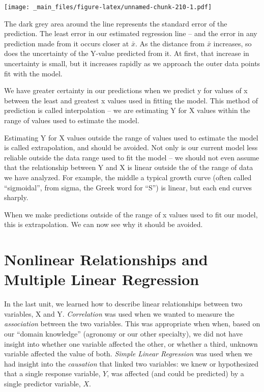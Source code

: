 \documentclass[
]{book}
\begin{document}
\texttt{[image: \_main\_files/figure-latex/unnamed-chunk-210-1.pdf]}

The dark grey area around the line represents the standard error of the prediction. The least error in our estimated regression line -- and the error in any prediction made from it occurs closer at \(\bar{x}\). As the distance from \(\bar{x}\) increases, so does the uncertainty of the Y-value predicted from it. At first, that increase in uncertainty is small, but it increases rapidly as we approach the outer data points fit with the model.

We have greater certainty in our predictions when we predict y for values of x between the least and greatest x values used in fitting the model. This method of prediction is called interpolation -- we are estimating Y for X values within the range of values used to estimate the model.

Estimating Y for X values outside the range of values used to estimate the model is called extrapolation, and should be avoided. Not only is our current model less reliable outside the data range used to fit the model -- we should not even assume that the relationship between Y and X is linear outside the of the range of data we have analyzed. For example, the middle a typical growth curve (often called ``sigmoidal'', from sigma, the Greek word for ``S'') is linear, but each end curves sharply.

When we make predictions outside of the range of x values used to fit our model, this is extrapolation. We can now see why it should be avoided.

\hypertarget{nonlinear-relationships-and-multiple-linear-regression}{%
\chapter{Nonlinear Relationships and Multiple Linear Regression}\label{nonlinear-relationships-and-multiple-linear-regression}}

In the last unit, we learned how to describe linear relationships between two variables, X and Y. \emph{Correlation} was used when we wanted to measure the \emph{association} between the two variables. This was appropriate when when, based on our ``domain knowledge'' (agronomy or our other specialty), we did not have insight into whether one variable affected the other, or whether a third, unknown variable affected the value of both. \emph{Simple Linear Regression} was used when we had insight into the \emph{causation} that linked two variables: we knew or hypothesized that a single response variable, \(Y\), was affected (and could be predicted) by a single predictor variable, \(X\).
\end{document}
